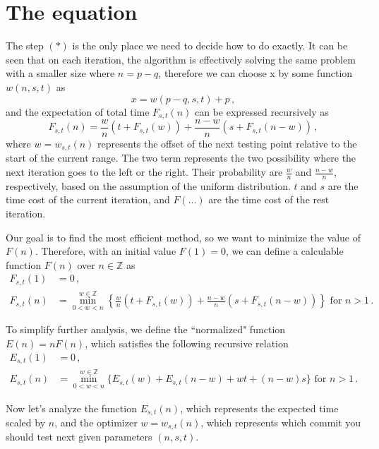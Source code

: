 \documentclass[]{article}
\begin{document}
\section{The equation}
 
The step $(*)$ is the only place we need to decide how to do exactly. It can be seen that on each iteration, the algorithm is effectively solving the same problem with a smaller size where $n = p - q$, therefore we can choose x by some function $w(n, s, t)$ as
\[
x = w(p - q, s, t) + p \,,
\]
and the expectation of total time $F_{s,t}(n)$ can be expressed recursively as
\begin{equation}
F_{s,t}(n) = \frac{w}{n}(t + F_{s,t}(w)) + \frac{n-w}{n}(s + F_{s,t}(n-w))\,,
\end{equation}
where $w = w_{s,t}(n)$ represents the offset of the next testing point relative to the start of the current range. The two term represents the two possibility where the next iteration goes to the left or the right. Their probability are $\frac{w}{n}$ and $\frac{n-w}{n}$, respectively, based on the assumption of the uniform distribution. $t$ and $s$ are the time cost of the current iteration, and $F(...)$ are the time cost of the rest iteration.

Our goal is to find the most efficient method, so we want to minimize the value of $F(n)$. Therefore, with an initial value $F(1) = 0$, we can define a calculable function $F(n)$ over $n \in \mathbb{Z}$ as
\begin{align*}
F_{s,t}(1) &= 0\,,\\
F_{s,t}(n) &= \min_{0<w<n}^{w\in\mathbb{Z}}\left\{\frac{w}{n}(t + F_{s,t}(w)) + \frac{n-w}{n}(s + F_{s,t}(n-w))\right\} \textrm{ for } n > 1 \,.
\end{align*}

To simplify further analysis, we define the ``normalized" function $E(n) = nF(n)$, which satisfies the following recursive relation
\begin{align*}
E_{s,t}(1) &= 0\,,\\
E_{s,t}(n) &= \min_{0<w<n}^{w\in\mathbb{Z}}\{E_{s,t}(w) + E_{s,t}(n-w) + wt +(n-w)s\} \textrm{ for } n > 1 \,.
\end{align*}

Now let's analyze the function $E_{s,t}(n)$, which represents the expected time scaled by $n$, and the optimizer $w = w_{s,t}(n)$, which represents which commit you should test next given parameters $(n,s,t)$.
\end{document}
